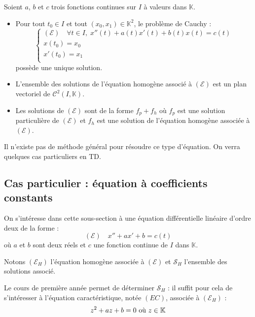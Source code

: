 \documentclass[french,11pt,twoside]{VcCours}
\begin{document}
\begin{Theoreme}{} Soient $a$, $b$ et $c$ trois fonctions continues sur $I$ à valeurs dans $\mathbb{K}$.

\begin{itemize}
\item Pour tout $t_0 \in I$ et tout $(x_0,x_1) \in \mathbb{K}^2$, le problème de Cauchy :
$$ \left\lbrace \begin{array}{l}
(\mathcal{E}) \quad \forall t \in I, \; x''(t)+a(t)x'(t)+b(t)x(t) = c(t)  \\
x(t_0)=x_0 \\
x'(t_0) = x_1 \\
\end{array}\right.$$
possède une unique solution.
\item L'ensemble des solutions de l'équation homogène associé à $(\mathcal{E})$ est un plan vectoriel de $\mathcal{C}^2(I, \mathbb{K})$.
\item Les solutions de $(\mathcal{E})$ sont de la forme $f_p + f_h$ où $f_p$ est une solution particulière de $(\mathcal{E})$ et $f_h$ est une solution de l'équation homogène associée à $(\mathcal{E})$.
\end{itemize}
\end{Theoreme}

\begin{Remarque}{} Il n'existe pas de méthode général pour résoudre ce type d'équation. On verra quelques cas particuliers en TD.
\end{Remarque}

\subsection{Cas particulier : équation à coefficients constants}

On s'intéresse dans cette sous-section à une équation différentielle linéaire d'ordre deux de la forme :
$$ (\mathcal{E}) \quad x''+ax'+b=c(t)$$
où $a$ et $b$ sont deux réels et $c$ une fonction continue de $I$ dans $\mathbb{K}$.



Notons $(\mathcal{E}_H)$ l'équation homogène associée à $(\mathcal{E})$ et $\mathcal{S}_H$ l'ensemble des solutions associé.



Le cours de première année permet de déterminer $\mathcal{S}_H$ : il suffit pour cela de s'intéresser à l'équation caractéristique, notée $(EC)$, associée à $(\mathcal{E}_H)$ :
$$ z^2+az+b=0 \hbox{ où } z \in \mathbb{K}$$
\end{document}
